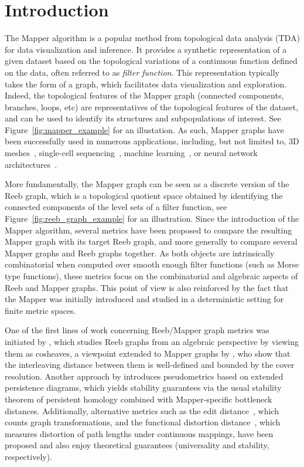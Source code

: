\documentclass[pdflatex,sn-mathphys-ay]{sn-jnl}%
\newcommand{\change}[1]{\noindent #1}
\theoremstyle{thmstyleone}%
\begin{document}
\section{Introduction} \label{sec:disc}


The Mapper algorithm is a popular method from topological data analysis (TDA) for data visualization and inference. It provides a synthetic representation of a given dataset based on the topological variations of a continuous function defined on the data, often referred to as {\em filter function}. This representation typically takes the form of a graph, which facilitates data visualization and exploration. Indeed, the topological features of the Mapper graph (connected components, branches, loops, etc) are representatives of the topological features of the dataset, and can be used to identify its structures and subpopulations of interest. See Figure~\ref{fig:mapper_example} for an illustation. As such, Mapper graphs have been successfully used in numerous applications, including, but not limited to, 3D meshes~\citep{wang2020exploration,rosen2018inferring}, single-cell sequencing~\citep{wang2018topological,zechel2014topographical},  machine learning~\citep{Bruel-Gabrielsson2018, Naitzat2018}, or neural network architectures~\citep{Mitra21,joseph2021topological}. 

More fundamentally, the Mapper graph can be seen as a discrete version of the Reeb graph, which is a topological quotient space obtained by identifying the connected components of the level sets of a filter function, see Figure~\ref{fig:reeb_graph_example} for an illustration. Since the introduction of the Mapper algorithm, several metrics have been proposed to compare the resulting Mapper graph with its target Reeb graph, and more generally to compare several Mapper graphs and Reeb graphs together. As both objects are intrinsically combinatorial when computed over smooth enough filter functions (such as Morse type functions), %
these metrics focus on the combinatorial and algebraic aspects of Reeb and Mapper graphs. This point of view is also reinforced by the fact that the Mapper was initially introduced and studied in a deterministic setting for finite metric spaces. 

\change{One of the first lines of work concerning Reeb/Mapper graph metrics was initiated by \citet{de2016categorified}, which studies Reeb graphs from an algebraic perspective by viewing them as cosheaves, a viewpoint extended to Mapper graphs by \citet{munch_convergence_2016}, who show that the interleaving distance between them is well-defined and bounded by the cover resolution. Another approach by \citet{carriere2018structure} introduces pseudometrics based on extended persistence diagrams, which yields stability guarantees via the usual stability theorem of persistent homology combined with Mapper-specific bottleneck distances. Additionally, alternative metrics such as the edit distance~\citep{bauer_edit_2016, bauer_reeb_2021}, which counts graph transformations, and the functional distortion distance~\citep{bauer_measuring_2014}, which measures distortion of path lengths under continuous mappings, have been proposed and also enjoy theoretical guarantees (universality and stability, respectively).}
\end{document}
